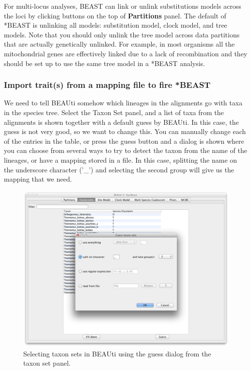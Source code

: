 \documentclass{article}
\begin{document}
For multi-locus analyses, BEAST can link or unlink substitutions models across the loci by clicking buttons on the top of {\bf Partitions} panel. The default of *BEAST is unlinking all models: substitution model, clock model, and tree models. Note that you should only unlink the tree model across data partitions that are actually genetically unlinked. For example, in most organisms all the mitochondrial genes are effectively linked due to a lack of recombination and they should be set up to use the same tree model in a *BEAST analysis. 

\subsubsection*{Import trait(s) from a mapping file to fire *BEAST}

We need to tell BEAUti somehow which lineages in the alignments go with taxa in the species tree. Select the Taxon Set panel, and a list of taxa from the alignments is shown together with a default guess by BEAUti. In this case, the guess is not very good, so we want to change this. You can manually change each of the entries in the table, or press the guess button and a dialog is shown where you can choose from several ways to try to detect the taxon from the name of the lineages, or have a mapping stored in a file. In this case, splitting the name on the underscore character ('\_') and selecting the second group will give us the mapping that we need.

\begin{figure}
\begin{center}

\includegraphics[scale=0.4]{figures/BEAUti_Guess_Taxonsets}

\end{center}
\caption{\label{fig.taxonset} Selecting taxon sets in BEAUti using the guess dialog from the taxon set panel.}
\end{figure}
\end{document}
